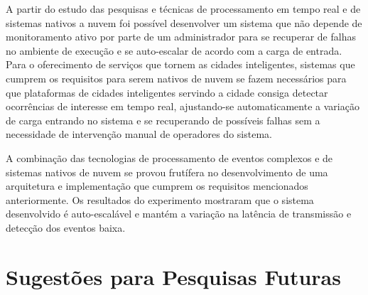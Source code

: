 A partir do estudo das pesquisas e técnicas de processamento em tempo real e de sistemas nativos a nuvem foi possível desenvolver um sistema que não depende de monitoramento ativo por parte de um administrador para se recuperar de falhas no ambiente de execução e se auto-escalar de acordo com a carga de entrada. Para o oferecimento de serviços que tornem as cidades inteligentes, sistemas que cumprem os requisitos para serem nativos de nuvem se fazem necessários para que plataformas de cidades inteligentes servindo a cidade consiga detectar ocorrências de interesse em tempo real, ajustando-se automaticamente a variação de carga entrando no sistema e se recuperando de possíveis falhas sem a necessidade de intervenção manual de operadores do sistema.



A combinação das tecnologias de processamento de eventos complexos e de sistemas nativos de nuvem se provou frutífera no desenvolvimento de uma arquitetura e implementação que cumprem os requisitos mencionados anteriormente. 
Os resultados do experimento mostraram que o sistema desenvolvido é auto-escalável e mantém a variação na latência de transmissão e detecção dos eventos baixa.










\section{Sugestões para Pesquisas Futuras} 

